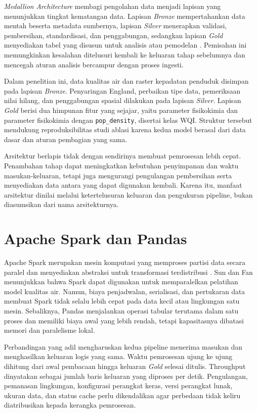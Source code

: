 \textit{Medallion Architecture} membagi pengolahan data menjadi lapisan yang menunjukkan tingkat kematangan data. Lapisan \textit{Bronze} mempertahankan data mentah beserta metadata sumbernya, lapisan \textit{Silver} menerapkan validasi, pembersihan, standardisasi, dan penggabungan, sedangkan lapisan \textit{Gold} menyediakan tabel yang disusun untuk analisis atau pemodelan \cite{databricks_medallion_2024}. Pemisahan ini memungkinkan kesalahan ditelusuri kembali ke keluaran tahap sebelumnya dan mencegah aturan analisis bercampur dengan proses ingesti.

Dalam penelitian ini, data kualitas air dan raster kepadatan penduduk disimpan pada lapisan \textit{Bronze}. Penyaringan England, perbaikan tipe data, pemeriksaan nilai hilang, dan penggabungan spasial dilakukan pada lapisan \textit{Silver}. Lapisan \textit{Gold} berisi dua himpunan fitur yang sejajar, yaitu parameter fisikokimia dan parameter fisikokimia dengan \texttt{pop\_density}, disertai kelas WQI. Struktur tersebut mendukung reproduksibilitas studi ablasi karena kedua model berasal dari data dasar dan aturan pembagian yang sama.

Arsitektur berlapis tidak dengan sendirinya membuat pemrosesan lebih cepat. Penambahan tahap dapat meningkatkan kebutuhan penyimpanan dan waktu masukan-keluaran, tetapi juga mengurangi pengulangan pembersihan serta menyediakan data antara yang dapat digunakan kembali. Karena itu, manfaat arsitektur dinilai melalui ketertelusuran keluaran dan pengukuran pipeline, bukan diasumsikan dari nama arsitekturnya.

\section{Apache Spark dan Pandas}

Apache Spark merupakan mesin komputasi yang memproses partisi data secara paralel dan menyediakan abstraksi untuk transformasi terdistribusi \cite{zaharia_apache_2016}. Sun dan Fan \cite{sun_combined_2022} menunjukkan bahwa Spark dapat digunakan untuk memparalelkan pelatihan model kualitas air. Namun, biaya penjadwalan, serialisasi, dan pertukaran data membuat Spark tidak selalu lebih cepat pada data kecil atau lingkungan satu mesin. Sebaliknya, Pandas menjalankan operasi tabular terutama dalam satu proses dan memiliki biaya awal yang lebih rendah, tetapi kapasitasnya dibatasi memori dan paralelisme lokal.

Perbandingan yang adil mengharuskan kedua pipeline menerima masukan dan menghasilkan keluaran logis yang sama. Waktu pemrosesan ujung ke ujung dihitung dari awal pembacaan hingga keluaran \textit{Gold} selesai ditulis. Throughput dinyatakan sebagai jumlah baris keluaran yang diproses per detik. Pengulangan, pemanasan lingkungan, konfigurasi perangkat keras, versi perangkat lunak, ukuran data, dan status cache perlu dikendalikan agar perbedaan tidak keliru diatribusikan kepada kerangka pemrosesan.

